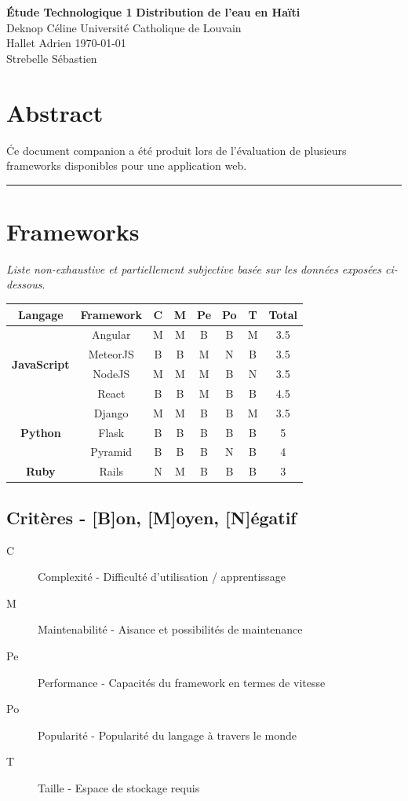 \documentclass[a4paper, 11pt]{article}
\begin{document}
\large\textbf{\'Etude Technologique 1} \hfill \textbf{Distribution de l'eau en Haïti} \\
\normalsize Deknop Céline \hfill Université Catholique de Louvain \\
Hallet Adrien \hfill \today \\
Strebelle Sébastien

\section*{Abstract}
\'Ce document companion a été produit lors de l'évaluation de plusieurs frameworks disponibles pour une application web.

\hrule
\section*{Frameworks}
\textit{Liste non-exhaustive et partiellement subjective basée sur les données exposées ci-dessous}.

\begin{table}[H]
    \centering
    \begin{tabular}{|c|c||c|c|c|c|c||c|}
        \hline
        \textbf{Langage} & \textbf{Framework} & \textbf{C} & \textbf{M} & \textbf{Pe} & \textbf{Po} & \textbf{T} & \textbf{Total} \\
        \hline
        \multirow{4}{*}{\textbf{JavaScript}} & Angular & M & M & B & B & M &3.5 \\
         & MeteorJS & B & B & M & N & B & 3.5\\
         & NodeJS & M & M & M & B & N & 3.5\\
         & React & B & B & M & B & B & 4.5\\
        \hline
        \multirow{3}{*}{\textbf{Python}} & Django & M & M & B & B & M& 3.5\\
         & Flask & B & B & B & B & B & 5\\
         & Pyramid & B & B & B & N & B & 4\\
        \hline
        \multirow{1}{*}{\textbf{Ruby}} & Rails & N & M & B & B & B & 3 \\
        \hline
    \end{tabular}
\end{table}
\subsection*{Critères - [B]on, [M]oyen, [N]égatif}
\begin{description}
    \item[C] Complexité - Difficulté d'utilisation / apprentissage
    \item[M] Maintenabilité - Aisance et possibilités de maintenance
    \item[Pe] Performance - Capacités du framework en termes de vitesse
    \item[Po] Popularité - Popularité du langage à travers le monde
    \item[T] Taille - Espace de stockage requis
\end{description}
\end{document}
